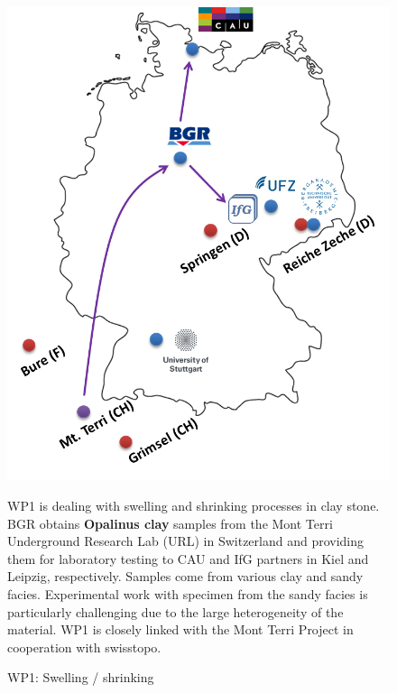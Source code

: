 \begin{figure}[ht!]
\begin{minipage}{0.48\textwidth}
\includegraphics[width=\textwidth]{figures/geomint-wp1.png}
\caption{WP1: Swelling / shrinking}
\end{minipage}
\hfill
\begin{minipage}{0.48\textwidth}
WP1 is dealing with swelling and shrinking processes in clay stone. BGR obtains \textbf{Opalinus clay} samples from the Mont Terri Underground Research Lab (URL) in Switzerland and providing them for laboratory testing to CAU and IfG partners in Kiel and Leipzig, respectively. Samples come from various clay and sandy facies. Experimental work with specimen from the sandy facies is particularly challenging due to the large heterogeneity of the material. WP1 is closely linked with the Mont Terri Project in cooperation with swisstopo.
\end{minipage}
\end{figure}

